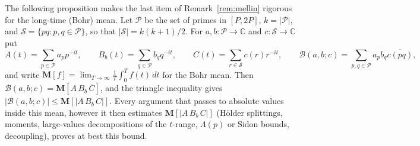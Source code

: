 \documentclass[11pt]{amsart}
\theoremstyle{definition}
\theoremstyle{remark}
\begin{document}
The following proposition makes the last item of Remark~\ref{rem:mellin} rigorous for the long-time (Bohr) mean. Let $\mathcal P$ be the set of primes in $[P,2P]$, $k=|\mathcal P|$, and $\mathcal S=\{pq:p,q\in\mathcal P\}$, so that $|\mathcal S|=k(k+1)/2$. For $a,b:\mathcal P\to\mathbb C$ and $c:\mathcal S\to\mathbb C$ put
\[
A(t)=\sum_{p\in\mathcal P}a_pp^{-it},\qquad B_b(t)=\sum_{q\in\mathcal P}b_qq^{-it},\qquad C(t)=\sum_{r\in\mathcal S}c(r)r^{-it},\qquad \mathcal B(a,b;c)=\sum_{p,q\in\mathcal P}a_pb_q\overline{c(pq)},
\]
and write $\mathbf M[f]=\lim_{T\to\infty}\frac1T\int_0^Tf(t)\,dt$ for the Bohr mean. Then $\mathcal B(a,b;c)=\mathbf M[A\,B_b\,\overline C]$, and the triangle inequality gives $|\mathcal B(a,b;c)|\le\mathbf M[|A\,B_b\,C|]$. Every argument that passes to absolute values inside this mean, however it then estimates $\mathbf M[|A\,B_b\,C|]$ (Hölder splittings, moments, large-values decompositions of the $t$-range, $\Lambda(p)$ or Sidon bounds, decoupling), proves at best this bound.
\end{document}
